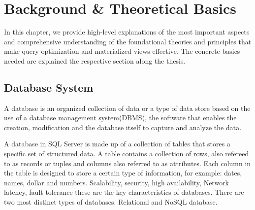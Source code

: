 \section{Background \& Theoretical Basics }

In this chapter, we provide high-level explanations of the most important aspects and comprehensive understanding of the foundational theories and principles that make query optimization and materialized views effective. The concrete basics needed are explained the respective section along the thesis.

\subsection{ Database System}

\begin{definition}
A database is an organized collection of data or a type of data store based on the use of a database management system(DBMS), the software that enables the creation, modification and the database itself to capture and analyze the data.\end{definition}\vspace{.4cm}
A database in SQL Server is made up of a collection of tables that stores a specific set of structured data. A table contains a collection of rows, also refereed to as records or tuples and columns also referred to as attributes. Each column in the table is designed to store a certain type of information, for example: dates, names, dollar and numbers.\cite{williamdassafmsft-2024} Scalability, security, high availability, Network latency, fault tolerance these are the key characteristics of databases. There are two most distinct types of databases: Relational and NoSQL database.

